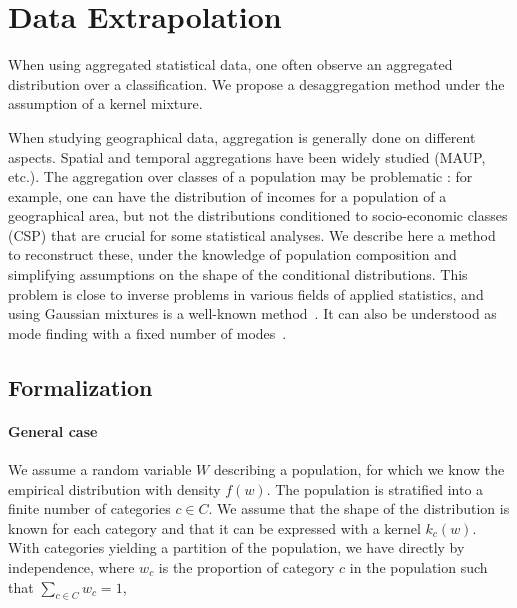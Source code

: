 






\section{Data Extrapolation}

When using aggregated statistical data, one often observe an aggregated distribution over a classification. We propose a desaggregation method under the assumption of a kernel mixture.

When studying geographical data, aggregation is generally done on different aspects. Spatial and temporal aggregations have been widely studied (MAUP, etc.). The aggregation over classes of a population may be problematic : for example, one can have the distribution of incomes for a population of a geographical area, but not the distributions conditioned to socio-economic classes (CSP) that are crucial for some statistical analyses. We describe here a method to reconstruct these, under the knowledge of population composition and simplifying assumptions on the shape of the conditional distributions. This problem is close to inverse problems in various fields of applied statistics, and using Gaussian mixtures is a well-known method~\cite{yu2012solving}. It can also be understood as mode finding with a fixed number of modes~\cite{carreira2000mode}.


\subsection{Formalization}

\paragraph{General case}

We assume a random variable $W$ describing a population, for which we know the empirical distribution with density $f(w)$. The population is stratified into a finite number of categories $c\in C$. We assume that the shape of the distribution is known for each category and that it can be expressed with a kernel $k_c (w)$. With categories yielding a partition of the population, we have directly by independence, where $w_c$ is the proportion of category $c$ in the population such that $\sum_{c\in C} w_c = 1$,

